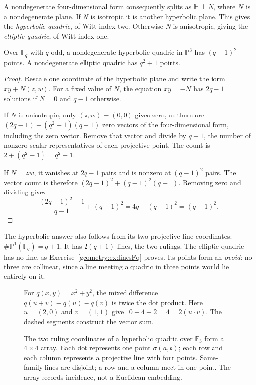 A nondegenerate four-dimensional form consequently splits as
$\mathbb H\perp N$, where $N$ is a nondegenerate plane.
If $N$ is isotropic it is another hyperbolic plane. This gives the
\emph{hyperbolic quadric}, of Witt index two. Otherwise $N$ is anisotropic,
giving the \emph{elliptic quadric}, of Witt index one.

\begin{theorem}\label{geometry:thm:countquadric}
Over $\mathbb F_q$ with $q$ odd, a nondegenerate hyperbolic quadric in
$\mathbb P^3$ has $(q+1)^2$ points. A nondegenerate elliptic quadric has
$q^2+1$ points.
\end{theorem}
\begin{proof}
Rescale one coordinate of the hyperbolic plane and write the form
$xy+N(z,w)$. For a fixed value of $N$, the equation $xy=-N$ has
$2q-1$ solutions if $N=0$ and $q-1$ otherwise.

If $N$ is anisotropic, only $(z,w)=(0,0)$ gives zero, so there are
$(2q-1)+(q^2-1)(q-1)$ zero vectors of the four-dimensional form,
including the zero vector. Remove that vector and divide by $q-1$,
the number of nonzero scalar representatives of each projective point.
The count is $2+(q^2-1)=q^2+1$.

If $N=zw$, it vanishes at $2q-1$ pairs and is nonzero at $(q-1)^2$
pairs. The vector count is therefore
$(2q-1)^2+(q-1)^2(q-1)$. Removing zero and dividing gives
\[
 \frac{(2q-1)^2-1}{q-1}+(q-1)^2
 =4q+(q-1)^2=(q+1)^2.
\]
\end{proof}

The hyperbolic answer also follows from its two projective-line
coordinates: $\#\mathbb P^1(\mathbb F_q)=q+1$.
It has $2(q+1)$ lines, the two rulings. The elliptic quadric has no line,
as Exercise~\ref{geometry:ex:linesFq} proves. Its points form an
\emph{ovoid}: no three are collinear, since a line meeting a quadric in
three points would lie entirely on it.

\begin{figure}[ht]
\centering
{}
\caption{For $q(x,y)=x^2+y^2$, the mixed difference $q(u+v)-q(u)-q(v)$ is twice the dot product. Here $u=(2,0)$ and $v=(1,1)$ give $10-4-2=4=2(u\cdot v)$. The dashed segments construct the vector sum.}
\label{geometry:fig:v9-polarisation}
\end{figure}
\begin{figure}[ht]
\centering
{}
\caption{The two ruling coordinates of a hyperbolic quadric over $\mathbb F_3$ form a $4\times4$ array. Each dot represents one point $\sigma(a,b)$; each row and each column represents a projective line with four points. Same-family lines are disjoint; a row and a column meet in one point. The array records incidence, not a Euclidean embedding.}
\label{geometry:fig:v9-projective-grid}
\end{figure}


